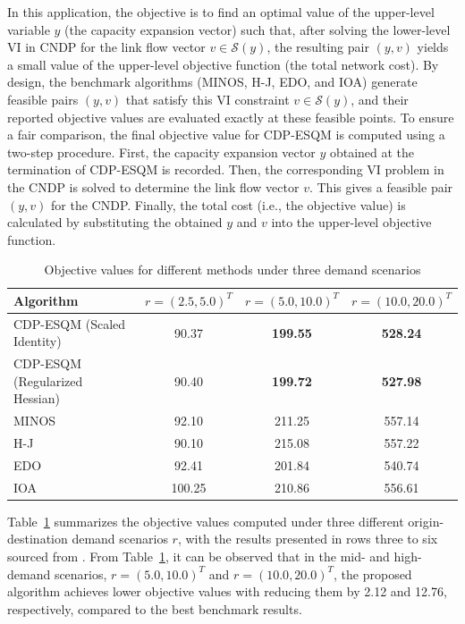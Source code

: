 \documentclass[11pt,a4paper]{article}
\theoremstyle{plain}
\begin{document}
In this application, the objective is to find an optimal value of the upper-level variable 
$y$ (the capacity expansion vector) such that, after solving the lower-level VI in CNDP for the link flow vector $v \in \mathcal{S}(y)$, the resulting pair $(y,v)$ yields a small value of the upper-level objective function (the total network cost).
By design, the benchmark algorithms (MINOS, H-J, EDO, and IOA) generate feasible pairs $(y,v)$ that satisfy this VI constraint $v \in \mathcal{S}(y)$, and their reported objective values are evaluated exactly at these feasible points.
To ensure a fair comparison, the final objective value for CDP-ESQM is computed using a two-step procedure. First, the capacity expansion vector $y$ obtained at the termination of CDP-ESQM is recorded. Then, the corresponding VI problem in the CNDP is solved to determine the link flow vector 
$v$. This gives a feasible pair $(y,v)$ for the CNDP. Finally, the total cost (i.e., the objective value) is calculated by substituting the obtained $y$ and $v$ into the upper-level objective function.


\begin{table}[htbp]
\centering
\caption{Objective values for different methods under three demand scenarios}
\label{tab:Comparison of Methods for Demand Scenarios}
\small 
\begin{tabular}{@{}lccc@{}}
\toprule
\textbf{Algorithm} & $r=(2.5,5.0)^T$ & $r=(5.0,10.0)^T$ & $r=(10.0,20.0)^T$ \\ 
\midrule
CDP-ESQM (Scaled Identity)   & {90.37}    & \bf{199.55}    &  \bf{528.24}    \\
CDP-ESQM (Regularized Hessian)  & {90.40}    & \bf{199.72}    & \bf{527.98}    \\
MINOS               & 92.10       & 211.25      & 557.14       \\
H-J                 & 90.10       & 215.08      & 557.22       \\
EDO                 & 92.41       & 201.84      & 540.74       \\ 
IOA                 & 100.25      & 210.86      & 556.61       \\ 
\bottomrule
\end{tabular}
\end{table}


Table~\ref{tab:Comparison of Methods for Demand Scenarios} summarizes the objective values computed under three different origin-destination demand scenarios \( r \), with the results presented in rows three to six sourced from \cite[Table VII]{suwansirikul1987edo}.  
From Table~\ref{tab:Comparison of Methods for Demand Scenarios}, it can be observed that in the mid- and high-demand scenarios, \( r=(5.0,10.0)^T \) and \( r=(10.0,20.0)^T \), the proposed algorithm achieves lower objective values with reducing them by 2.12 and {12.76}, respectively, compared to the best benchmark results.
\end{document}
